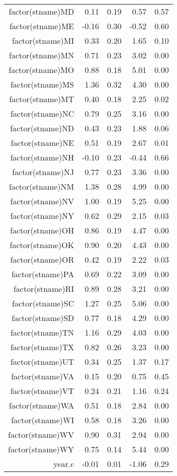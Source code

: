 \begin{table}[ht]
\begin{tabular}{rrrrr}
  factor(stname)MD & 0.11 & 0.19 & 0.57 & 0.57 \\ 
  factor(stname)ME & -0.16 & 0.30 & -0.52 & 0.60 \\ 
  factor(stname)MI & 0.33 & 0.20 & 1.65 & 0.10 \\ 
  factor(stname)MN & 0.71 & 0.23 & 3.02 & 0.00 \\ 
  factor(stname)MO & 0.88 & 0.18 & 5.01 & 0.00 \\ 
  factor(stname)MS & 1.36 & 0.32 & 4.30 & 0.00 \\ 
  factor(stname)MT & 0.40 & 0.18 & 2.25 & 0.02 \\ 
  factor(stname)NC & 0.79 & 0.25 & 3.16 & 0.00 \\ 
  factor(stname)ND & 0.43 & 0.23 & 1.88 & 0.06 \\ 
  factor(stname)NE & 0.51 & 0.19 & 2.67 & 0.01 \\ 
  factor(stname)NH & -0.10 & 0.23 & -0.44 & 0.66 \\ 
  factor(stname)NJ & 0.77 & 0.23 & 3.36 & 0.00 \\ 
  factor(stname)NM & 1.38 & 0.28 & 4.99 & 0.00 \\ 
  factor(stname)NV & 1.00 & 0.19 & 5.25 & 0.00 \\ 
  factor(stname)NY & 0.62 & 0.29 & 2.15 & 0.03 \\ 
  factor(stname)OH & 0.86 & 0.19 & 4.47 & 0.00 \\ 
  factor(stname)OK & 0.90 & 0.20 & 4.43 & 0.00 \\ 
  factor(stname)OR & 0.42 & 0.19 & 2.22 & 0.03 \\ 
  factor(stname)PA & 0.69 & 0.22 & 3.09 & 0.00 \\ 
  factor(stname)RI & 0.89 & 0.28 & 3.21 & 0.00 \\ 
  factor(stname)SC & 1.27 & 0.25 & 5.06 & 0.00 \\ 
  factor(stname)SD & 0.77 & 0.18 & 4.29 & 0.00 \\ 
  factor(stname)TN & 1.16 & 0.29 & 4.03 & 0.00 \\ 
  factor(stname)TX & 0.82 & 0.26 & 3.23 & 0.00 \\ 
  factor(stname)UT & 0.34 & 0.25 & 1.37 & 0.17 \\ 
  factor(stname)VA & 0.15 & 0.20 & 0.75 & 0.45 \\ 
  factor(stname)VT & 0.24 & 0.21 & 1.16 & 0.24 \\ 
  factor(stname)WA & 0.51 & 0.18 & 2.84 & 0.00 \\ 
  factor(stname)WI & 0.58 & 0.18 & 3.26 & 0.00 \\ 
  factor(stname)WV & 0.90 & 0.31 & 2.94 & 0.00 \\ 
  factor(stname)WY & 0.75 & 0.14 & 5.44 & 0.00 \\ 
  year.c & -0.01 & 0.01 & -1.06 & 0.29 \\ 
   \hline
\end{tabular}
\end{table}
